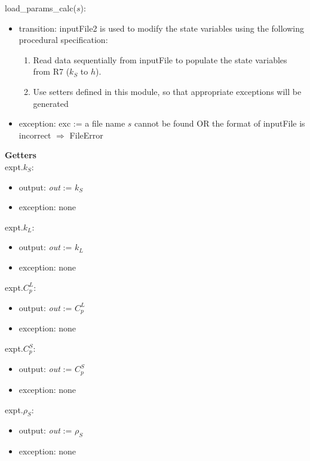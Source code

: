 \documentclass[12pt, titlepage]{article}
\begin{document}
\noindent load\_params\_calc($s$):
\begin{itemize}
\item transition:  {inputFile2} is used to modify the state variables using the following procedural specification:

\begin{enumerate}

\item Read data sequentially from inputFile to populate the state variables from
  R7 ($k_S$ to $h$).
\item Use setters defined in this module, so that appropriate exceptions will be
  generated

\end{enumerate}

\item exception: exc := a file name $s$ cannot be found OR the format of
  inputFile is incorrect $\Rightarrow$  FileError

\end{itemize}

\textbf{Getters}\\

\noindent expt.$k_{S}$:
\begin{itemize}
\item output: \textit{out} := $k_{S}$
\item exception: none
\end{itemize}

\noindent expt.$k_{L}$:
\begin{itemize}
\item output: \textit{out} := $k_{L}$
\item exception: none
\end{itemize}

\noindent expt.$C_{p}^L$:
\begin{itemize}
\item output: \textit{out} := $C_{p}^L$
\item exception: none
\end{itemize}

\noindent expt.$C_p^S$:
\begin{itemize}
\item output: \textit{out} := $C_p^S$
\item exception: none
\end{itemize}

\noindent expt.$\rho_S$:
\begin{itemize}
\item output: \textit{out} := $\rho_S$
\item exception: none
\end{itemize}
\end{document}
